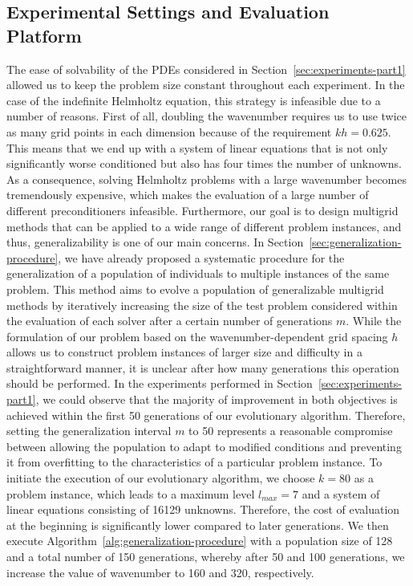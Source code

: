 \subsection{Experimental Settings and Evaluation Platform}
The ease of solvability of the PDEs considered in Section~\ref{sec:experiments-part1} allowed us to keep the problem size constant throughout each experiment.
In the case of the indefinite Helmholtz equation, this strategy is infeasible due to a number of reasons.
First of all, doubling the wavenumber requires us to use twice as many grid points in each dimension because of the requirement $kh = 0.625$.
This means that we end up with a system of linear equations that is not only significantly worse conditioned but also has four times the number of unknowns.
As a consequence, solving Helmholtz problems with a large wavenumber becomes tremendously expensive, which makes the evaluation of a large number of different preconditioners infeasible.
Furthermore, our goal is to design multigrid methods that can be applied to a wide range of different problem instances, and thus, generalizability is one of our main concerns.
In Section~\ref{sec:generalization-procedure}, we have already proposed a systematic procedure for the generalization of a population of individuals to multiple instances of the same problem.
This method aims to evolve a population of generalizable multigrid methods by iteratively increasing the size of the test problem considered within the evaluation of each solver after a certain number of generations $m$.
While the formulation of our problem based on the wavenumber-dependent grid spacing $h$ allows us to construct problem instances of larger size and difficulty in a straightforward manner, it is unclear after how many generations this operation should be performed.
In the experiments performed in Section~\ref{sec:experiments-part1}, we could observe that the majority of improvement in both objectives is achieved within the first 50 generations of our evolutionary algorithm.
Therefore, setting the generalization interval $m$ to 50 represents a reasonable compromise between allowing the population to adapt to modified conditions and preventing it from overfitting to the characteristics of a particular problem instance.
To initiate the execution of our evolutionary algorithm, we choose $k = 80$ as a problem instance, which leads to a maximum level $l_{max} = 7$ and a system of linear equations consisting of 16129 unknowns. 
Therefore, the cost of evaluation at the beginning is significantly lower compared to later generations.
We then execute Algorithm~\ref{alg:generalization-procedure} with a population size of 128 and a total number of 150 generations, whereby after 50 and 100 generations, we increase the value of wavenumber to 160 and 320, respectively.
